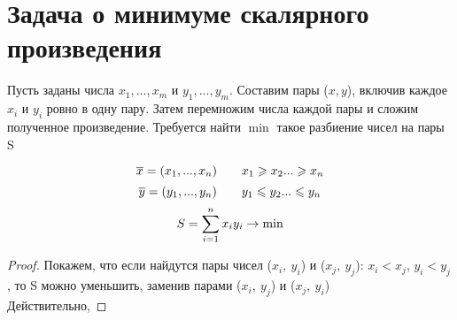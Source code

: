 \documentclass[discrete.tex]{subfiles}
\begin{document}
\section{Задача о минимуме скалярного произведения}
Пусть заданы числа $x_1,...,x_m$ и $y_1,...,y_m$. Составим пары ($x,y$), включив каждое $x_i$ и $y_i$ ровно в одну пару. Затем перемножим числа каждой пары и сложим полученное произведение. Требуется найти $\min$ такое разбиение чисел на пары S
\begin{Theorem}
  \[\overline{x} = (x_1,...,x_n) \qquad x_1 \geqslant x_2 ... \geqslant x_n\]
  \[\overline{y} = (y_1,...,y_n) \qquad y_1 \leqslant y_2 ... \leqslant y_n\]
  \[S = \sum_{i=1}^n x_i y_i \rightarrow \min\]
\end{Theorem}

\begin{proof}
  Покажем, что если найдутся пары чисел ($x_i,\ y_i$) и ($x_j,\ y_j$): $x_i < x_j$, $y_i < y_j$, то S можно уменьшить, заменив парами ($x_i,\ y_j$) и ($x_j,\ y_i$)\\
  Действительно,
\end{proof}
\end{document}

